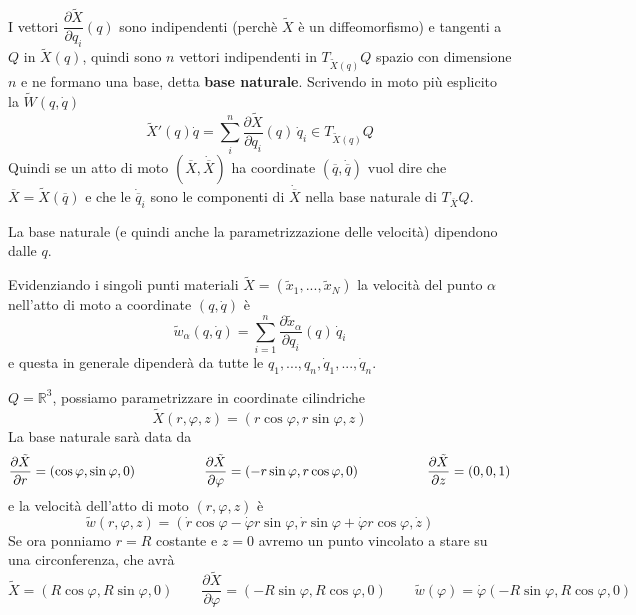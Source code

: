 \documentclass[11pt,a4paper,twoside]{book}
\newenvironment{esempio}[1][Esempio]{ 
  \begin{center}\begin{tcolorbox}[
  title={#1:\\},
  width=0.9\linewidth,
  flush right,
  enhanced jigsaw, 
  colback=white, 
  frame hidden, 
  sharpish corners, arc=3mm,
  borderline west = {1pt}{0pt}{gray},
  borderline south = {1pt}{0pt}{gray},
  coltitle=black, 
  fonttitle=\small\bfseries, 
  attach title to upper, 
  breakable,
  top=2.5pt, bottom=0.3pt]\small
  }{
 \normalsize \end{tcolorbox}\end{center}
}
\theoremstyle{esss}
\theoremstyle{dotless}
\numberwithin{equation}{section} %
\begin{document}
I vettori $\dfrac{\partial \tilde{X} } {\partial q_i} (q)$ sono indipendenti (perchè $\tilde{X}$ è un diffeomorfismo) e tangenti a $Q$ in $\tilde{X}(q)$, quindi sono $n$ vettori indipendenti in $T_{\tilde{X}(q)}Q$ spazio con dimensione $n$ e ne formano una base, detta \textbf{base naturale}.
Scrivendo in moto più esplicito la $\tilde{W}(q,\dot{q})$ 
\[
\tilde{X}'(q)\dot{q}=\sum_i^n \dfrac{\partial \tilde{X} }{\partial q_i}(q)\, \dot{q}_i \in T_{\tilde{X}(q)}Q
\]
Quindi se un atto di moto $\left(\overline{X},\dot{\overline{X}}\right)$ ha coordinate $(\overline{q},\dot{\overline{q}})$ vuol dire che $\overline{X}=\tilde{X}(\overline{q})$ e che le $\dot{\overline{q}}_i$ sono le componenti di $\dot{\overline{X}}$ nella base naturale di $T_{\overline{X}}Q$.

La base naturale (e quindi anche la parametrizzazione delle velocità) dipendono dalle $q$.

Evidenziando i singoli punti materiali $\tilde{X}=(\tilde{x}_1,...,\tilde{x}_N)$ la velocità del punto $\alpha$ nell'atto di moto a coordinate $(q,\dot{q})$ è
\begin{equation}
\tilde{w}_\alpha(q,\dot{q})=\sum_{i=1}^n \dfrac{\partial \tilde{x}_\alpha}{\partial q_i} (q) \, \dot{q}_i
\end{equation}
e questa in generale dipenderà da tutte le $q_1,...,q_n,\dot{q}_1,...,\dot{q}_n$.

\begin{esempio}[Punto libero in coordinate cilindriche]
$Q=\mathbb{R}^3$, possiamo parametrizzare in coordinate cilindriche
\[
\tilde{X}(r,\varphi,z)=(r\cos{\varphi}, r\sin{\varphi} , z)
\]
La base naturale sarà data da
\[
\dfrac{\partial \tilde{X} }{\partial r} = ( \cos{\varphi} , \sin{\varphi} , 0 ) \hspace{0.15\linewidth} 
\dfrac{\partial \tilde{X}}{\partial \varphi} = ( -r\sin{\varphi} , r\cos{\varphi} , 0 ) \hspace{0.15\linewidth}
\dfrac{\partial \tilde{X}}{\partial z} = ( 0 , 0 , 1 ) 
\]
e la velocità dell'atto di moto $(r,\varphi,z)$ è
\[
\tilde{w}(r,\varphi,z)= \left(\dot{r} \cos{\varphi} -\dot{\varphi}r\sin{\varphi},
\dot{r}\sin{\varphi}+\dot{\varphi}r\cos{\varphi}, \dot{z}\right)
\]
Se ora ponniamo $r=R$ costante e $z=0$ avremo un punto vincolato a stare su una circonferenza, che avrà
\[
\tilde{X}=(R\cos{\varphi},R\sin{\varphi},0) \qquad
\dfrac{ \partial \tilde{X} }{\partial \varphi} = ( -R\sin{\varphi} ,R\cos{\varphi},0)
\qquad
\tilde{w}(\varphi)=\dot{\varphi}(-R\sin{\varphi},R\cos{\varphi},0)
\]
\end{esempio}
\end{document}
